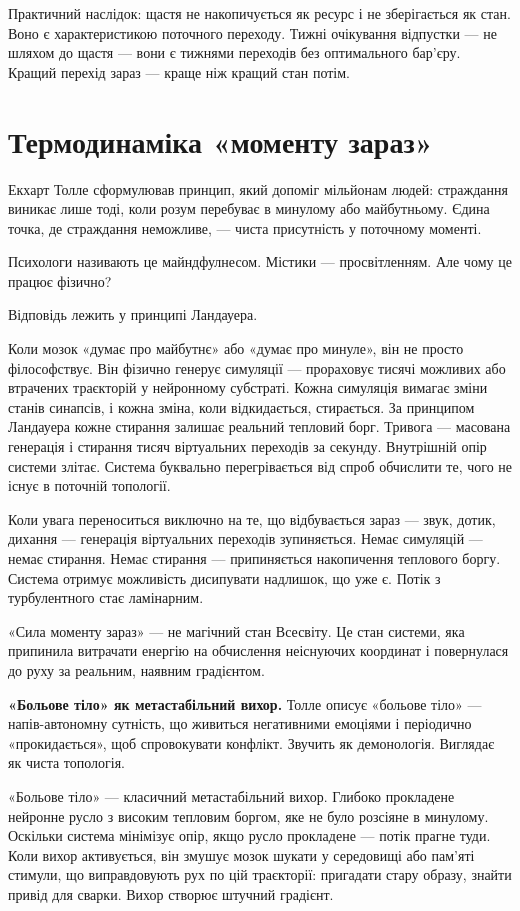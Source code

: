 \documentclass[12pt, a4paper, openany]{book}
\begin{document}
Практичний наслідок: щастя не накопичується як ресурс і не зберігається як стан. Воно є характеристикою поточного переходу. Тижні очікування відпустки — не шляхом до щастя --- вони є тижнями переходів без оптимального бар'єру. Кращий перехід зараз — краще ніж кращий стан потім.

\section{Термодинаміка «моменту зараз»}

Екхарт Толле сформулював принцип, який допоміг мільйонам людей: страждання виникає лише тоді, коли розум перебуває в минулому або майбутньому. Єдина точка, де страждання неможливе, — чиста присутність у поточному моменті.

Психологи називають це майндфулнесом. Містики — просвітленням. Але чому це працює фізично?

Відповідь лежить у принципі Ландауера.

Коли мозок «думає про майбутнє» або «думає про минуле», він не просто філософствує. Він фізично генерує симуляції — прораховує тисячі можливих або втрачених траєкторій у нейронному субстраті. Кожна симуляція вимагає зміни станів синапсів, і кожна зміна, коли відкидається, стирається. За принципом Ландауера кожне стирання залишає реальний тепловий борг. Тривога — масована генерація і стирання тисяч віртуальних переходів за секунду. Внутрішній опір системи злітає. Система буквально перегрівається від спроб обчислити те, чого не існує в поточній топології.

Коли увага переноситься виключно на те, що відбувається зараз — звук, дотик, дихання — генерація віртуальних переходів зупиняється. Немає симуляцій — немає стирання. Немає стирання — припиняється накопичення теплового боргу. Система отримує можливість дисипувати надлишок, що уже є. Потік з турбулентного стає ламінарним.

«Сила моменту зараз» — не магічний стан Всесвіту. Це стан системи, яка припинила витрачати енергію на обчислення неіснуючих координат і повернулася до руху за реальним, наявним градієнтом.

\textbf{«Больове тіло» як метастабільний вихор.}
Толле описує «больове тіло» — напів-автономну сутність, що живиться негативними емоціями і періодично «прокидається», щоб спровокувати конфлікт. Звучить як демонологія. Виглядає як чиста топологія.

«Больове тіло» — класичний метастабільний вихор. Глибоко прокладене нейронне русло з високим тепловим боргом, яке не було розсіяне в минулому. Оскільки система мінімізує опір, якщо русло прокладене — потік прагне туди. Коли вихор активується, він змушує мозок шукати у середовищі або пам'яті стимули, що виправдовують рух по цій траєкторії: пригадати стару образу, знайти привід для сварки. Вихор створює штучний градієнт.
\end{document}
